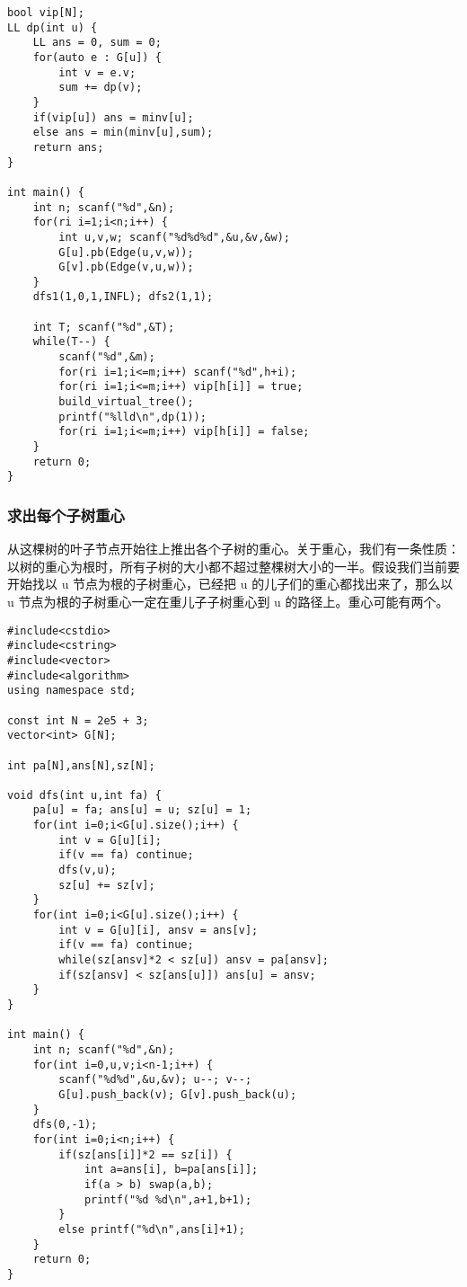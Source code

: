 \documentclass[UTF8]{ctexart}
\begin{document}
\begin{framed}
\begin{lstlisting}
bool vip[N];
LL dp(int u) {
    LL ans = 0, sum = 0;
    for(auto e : G[u]) {
        int v = e.v;
        sum += dp(v);
    }
    if(vip[u]) ans = minv[u];
    else ans = min(minv[u],sum);
    return ans;
}

int main() {
    int n; scanf("%d",&n);
    for(ri i=1;i<n;i++) {
        int u,v,w; scanf("%d%d%d",&u,&v,&w);
        G[u].pb(Edge(u,v,w));
        G[v].pb(Edge(v,u,w));
    } 
    dfs1(1,0,1,INFL); dfs2(1,1);
    
    int T; scanf("%d",&T);
    while(T--) {
        scanf("%d",&m);
        for(ri i=1;i<=m;i++) scanf("%d",h+i);
        for(ri i=1;i<=m;i++) vip[h[i]] = true;
        build_virtual_tree();
        printf("%lld\n",dp(1));
        for(ri i=1;i<=m;i++) vip[h[i]] = false;
    }
    return 0;
}
\end{lstlisting}
\end{framed}

\subsubsection{求出每个子树重心}
从这棵树的叶子节点开始往上推出各个子树的重心。关于重心，我们有一条性质：以树的重心为根时，所有子树的大小都不超过整棵树大小的一半。假设我们当前要开始找以 u 节点为根的子树重心，已经把 u 的儿子们的重心都找出来了，那么以 u 节点为根的子树重心一定在重儿子子树重心到 u 的路径上。重心可能有两个。
\begin{framed}
\begin{lstlisting}
#include<cstdio>
#include<cstring>
#include<vector>
#include<algorithm>
using namespace std;

const int N = 2e5 + 3;
vector<int> G[N];

int pa[N],ans[N],sz[N];

void dfs(int u,int fa) {
    pa[u] = fa; ans[u] = u; sz[u] = 1;
    for(int i=0;i<G[u].size();i++) {
        int v = G[u][i];
        if(v == fa) continue;
        dfs(v,u);
        sz[u] += sz[v];
    }
    for(int i=0;i<G[u].size();i++) {
        int v = G[u][i], ansv = ans[v];
        if(v == fa) continue;
        while(sz[ansv]*2 < sz[u]) ansv = pa[ansv];
        if(sz[ansv] < sz[ans[u]]) ans[u] = ansv;
    }
}

int main() {
    int n; scanf("%d",&n);
    for(int i=0,u,v;i<n-1;i++) {
        scanf("%d%d",&u,&v); u--; v--;
        G[u].push_back(v); G[v].push_back(u);
    }
    dfs(0,-1);
    for(int i=0;i<n;i++) {
        if(sz[ans[i]]*2 == sz[i]) {
            int a=ans[i], b=pa[ans[i]];
            if(a > b) swap(a,b);
            printf("%d %d\n",a+1,b+1);
        }
        else printf("%d\n",ans[i]+1);
    }
    return 0;
}
\end{lstlisting}
\end{framed}
\end{document}
